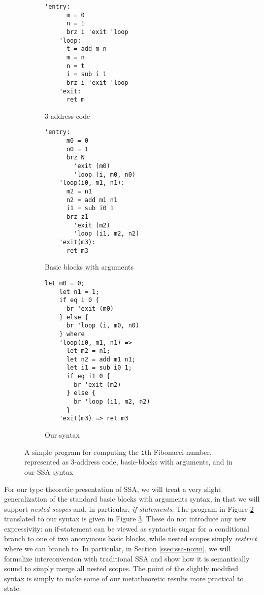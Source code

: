 \documentclass[acmsmall,screen,review]{acmart}
\begin{document}
\begin{figure}
  \centering
  \begin{subfigure}[t]{0.33\textwidth}
    \begin{BVerbatim}[baseline=t, gobble=3]
    'entry:
      m = 0
      n = 1
      brz i 'exit 'loop
    'loop:
      t = add m n
      m = n
      n = t
      i = sub i 1
      brz i 'exit 'loop
    'exit:
      ret m
    \end{BVerbatim}
    \caption{3-address code}
    \label{fig:3-addr}
  \end{subfigure}
  \begin{subfigure}[t]{0.32\textwidth}
    \begin{BVerbatim}[baseline=t, gobble=3]
      'entry:
      m0 = 0
      n0 = 1
      brz N 
        'exit (m0) 
        'loop (i, m0, n0)
    'loop(i0, m1, n1):
      m2 = n1
      n2 = add m1 n1
      i1 = sub i0 1
      brz z1 
        'exit (m2) 
        'loop (i1, m2, n2)
    'exit(m3):
      ret m3
    \end{BVerbatim}
    \caption{Basic blocks with arguments}
    \label{fig:bb-arg}
  \end{subfigure}
  \begin{subfigure}[t]{0.33\textwidth}
    \begin{BVerbatim}[baseline=t, gobble=3]
    let m0 = 0;
    let n1 = 1;
    if eq i 0 {
      br 'exit (m0)
    } else {
      br 'loop (i, m0, n0)
    } where
    'loop(i0, m1, n1) =>
      let m2 = n1;
      let n2 = add m1 n1;
      let i1 = sub i0 1;
      if eq i1 0 {
        br 'exit (m2)
      } else {
        br 'loop (i1, m2, n2)
      }
    'exit(m3) => ret m3
    \end{BVerbatim}
    \caption{Our syntax}
    \label{fig:our-syn}
  \end{subfigure}
  \caption{A simple program for computing the \texttt{i}th Fibonacci number, represented as 3-address code, basic-blocks with arguments, and in our SSA syntax}
  \Description{}
  \label{fig:ssa-examples}
\end{figure}

For our type theoretic presentation of SSA, we will treat a very slight
generalization of the standard basic blocks with arguments syntax, in that we
will support \textit{nested scopes} and, in particular, \textit{if-statements}.
The program in Figure \ref{fig:bb-arg} translated to our syntax is given in
Figure \ref{fig:our-syn}. These do not introduce any new expressivity: an
if-statement can be viewed as syntactic sugar for a conditional branch to one of
two anonymous basic blocks, while nested scopes simply \textit{restrict} where
we can branch to. In particular, in Section \ref{ssec:ssa-norm}, we will
formalize interconversion with traditional SSA and show how it is semantically
sound to simply merge all nested scopes. The point of the slightly modified
syntax is simply to make some of our metatheoretic results more practical to
state.
\end{document}
